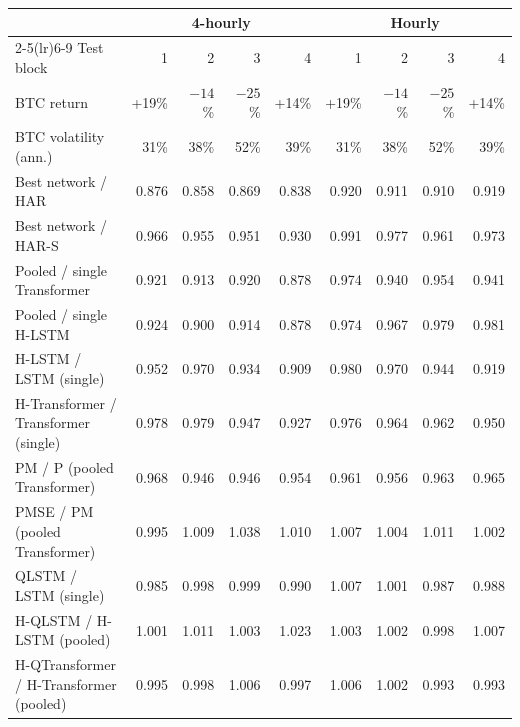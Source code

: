 \begin{tabular}{lrrrrrrrr}
\toprule
 & \multicolumn{4}{c}{4-hourly} & \multicolumn{4}{c}{Hourly} \\
\cmidrule(lr){2-5}\cmidrule(lr){6-9}
Test block & 1 & 2 & 3 & 4 & 1 & 2 & 3 & 4 \\
BTC return & +19\% & $-14$\% & $-25$\% & +14\% & +19\% & $-14$\% & $-25$\% & +14\% \\
BTC volatility (ann.) & 31\% & 38\% & 52\% & 39\% & 31\% & 38\% & 52\% & 39\% \\
\midrule
Best network / HAR & 0.876 & 0.858 & 0.869 & 0.838 & 0.920 & 0.911 & 0.910 & 0.919 \\
Best network / HAR-S & 0.966 & 0.955 & 0.951 & 0.930 & 0.991 & 0.977 & 0.961 & 0.973 \\
Pooled / single Transformer & 0.921 & 0.913 & 0.920 & 0.878 & 0.974 & 0.940 & 0.954 & 0.941 \\
Pooled / single H-LSTM & 0.924 & 0.900 & 0.914 & 0.878 & 0.974 & 0.967 & 0.979 & 0.981 \\
H-LSTM / LSTM (single) & 0.952 & 0.970 & 0.934 & 0.909 & 0.980 & 0.970 & 0.944 & 0.919 \\
H-Transformer / Transformer (single) & 0.978 & 0.979 & 0.947 & 0.927 & 0.976 & 0.964 & 0.962 & 0.950 \\
PM / P (pooled Transformer) & 0.968 & 0.946 & 0.946 & 0.954 & 0.961 & 0.956 & 0.963 & 0.965 \\
PMSE / PM (pooled Transformer) & 0.995 & 1.009 & 1.038 & 1.010 & 1.007 & 1.004 & 1.011 & 1.002 \\
QLSTM / LSTM (single) & 0.985 & 0.998 & 0.999 & 0.990 & 1.007 & 1.001 & 0.987 & 0.988 \\
H-QLSTM / H-LSTM (pooled) & 1.001 & 1.011 & 1.003 & 1.023 & 1.003 & 1.002 & 0.998 & 1.007 \\
H-QTransformer / H-Transformer (pooled) & 0.995 & 0.998 & 1.006 & 0.997 & 1.006 & 1.002 & 0.993 & 0.993 \\
\bottomrule
\end{tabular}
